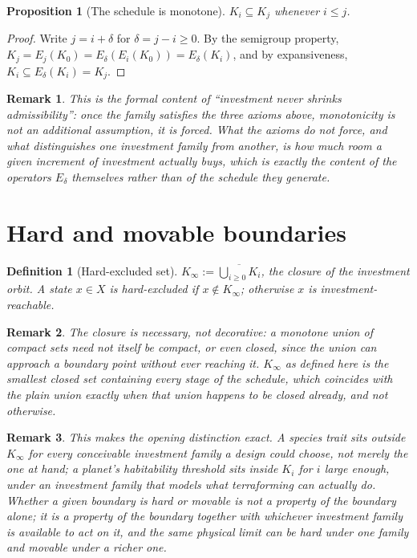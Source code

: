 \documentclass[11pt]{report}
\newtheorem{proposition}{Proposition}[chapter]
\newtheorem{definition}{Definition}[chapter]
\newtheorem{remark}{Remark}[chapter]
\begin{document}
\begin{proposition}[The schedule is monotone]
\label{prop:monotone}
$K_i \subseteq K_j$ whenever $i \leq j$.
\end{proposition}
\begin{proof}
Write $j = i + \delta$ for $\delta = j - i \geq 0$. By the semigroup
property, $K_j = E_j(K_0) = E_\delta(E_i(K_0)) = E_\delta(K_i)$, and by
expansiveness, $K_i \subseteq E_\delta(K_i) = K_j$.
\end{proof}

\begin{remark}
This is the formal content of ``investment never shrinks admissibility'':
once the family satisfies the three axioms above, monotonicity is not
an additional assumption, it is forced. What the axioms do not force,
and what distinguishes one investment family from another, is how
much room a given increment of investment actually buys, which is
exactly the content of the operators $E_\delta$ themselves rather than
of the schedule they generate.
\end{remark}

\section*{Hard and movable boundaries}

\begin{definition}[Hard-excluded set]
$K_\infty := \overline{\bigcup_{i \geq 0} K_i}$, the closure of the
investment orbit. A state $x \in X$ is hard-excluded if $x \notin
K_\infty$; otherwise $x$ is investment-reachable.
\end{definition}

\begin{remark}
The closure is necessary, not decorative: a monotone union of compact
sets need not itself be compact, or even closed, since the union can
approach a boundary point without ever reaching it. $K_\infty$ as
defined here is the smallest closed set containing every stage of the
schedule, which coincides with the plain union exactly when that
union happens to be closed already, and not otherwise.
\end{remark}

\begin{remark}
This makes the opening distinction exact. A species trait sits outside
$K_\infty$ for every conceivable investment family a design could
choose, not merely the one at hand; a planet's habitability threshold
sits inside $K_i$ for $i$ large enough, under an investment family
that models what terraforming can actually do. Whether a given
boundary is hard or movable is not a property of the boundary alone;
it is a property of the boundary together with whichever investment
family is available to act on it, and the same physical limit can be
hard under one family and movable under a richer one.
\end{remark}
\end{document}
